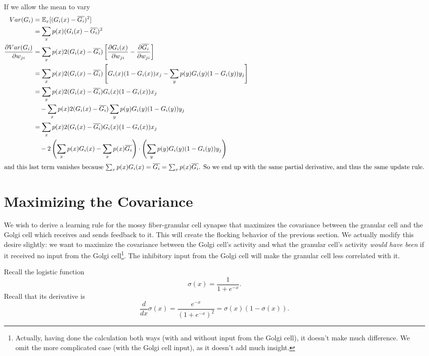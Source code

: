 \documentclass{article}
\theoremstyle{definition}
\begin{document}
If we allow the mean to vary
\begin{align*}
Var(G_i) &= \mathbb{E}_x [ (G_i(x) - \overline{G_i})^2 ] \\
&= \sum_x p(x) (G_i(x) - \overline{G_i})^2 \\
\frac{\partial Var(G_i)}{\partial w_{ji}} &= \sum_x p(x) 2 (G_i(x) -
\overline{G_i}) \left[ \frac{\partial G_i(x)}{\partial w_{ji}} -
  \frac{\partial \overline{G_i}}{\partial w_{ji}} \right]\\
&= \sum_x p(x) 2 (G_i(x) -
\overline{G_i}) \left[ G_i(x)(1-G_i(x)) x_j - \sum_y p(y) G_i(y)(1-G_i(y)) y_j \right]\\
&= \sum_x p(x) 2 (G_i(x) -
\overline{G_i}) G_i(x)(1-G_i(x)) x_j \\
&\quad - \sum_x p(x) 2 (G_i(x) - \overline{G_i}) \sum_y p(y) G_i(y)(1-G_i(y)) y_j \\
&= \sum_x p(x) 2 (G_i(x) -
\overline{G_i}) G_i(x)(1-G_i(x)) x_j \\
&\quad - 2 \left(\sum_x p(x) G_i(x) - \sum_x p(x)\overline{G_i} \right) \cdot \left( \sum_y p(y) G_i(y)(1-G_i(y)) y_j \right) \\
\intertext{and this last term vanishes because $\sum_x p(x) G_i(x) =
  \overline{G_i} = \sum_x p(x) \overline{G_i}$. So we end up with the
  same partial derivative, and thus the same update rule.}
\end{align*}



\section{Maximizing the Covariance}
\label{sec-covar}

We wish to derive a learning rule for the mossy fiber-granular cell
synapse that maximizes the covariance between the granular cell and
the Golgi cell which receives and sends feedback to it. This will
create the flocking behavior of the previous section. We actually
modify this desire slightly: we want to maximize the covariance
between the Golgi cell's activity and what the granular cell's
activity {\em would have been} if it received no input from the Golgi
cell\footnote{Actually, having done the calculation both ways (with
  and without input from the Golgi cell), it doesn't make much
  difference. We omit the more complicated case (with the Golgi cell
  input), as it doesn't add much insight.}. The inhibitory input from
the Golgi cell will make the granular cell less correlated with it.

Recall the logistic function $$\sigma(x) = \frac{1}{1 + e^{-x}}.$$
Recall that its derivative is $$\frac{d}{dx}\sigma(x) =
\frac{e^{-x}}{\left(1 + e^{-x} \right)^2} = \sigma(x)(1-\sigma(x)).$$
\end{document}
